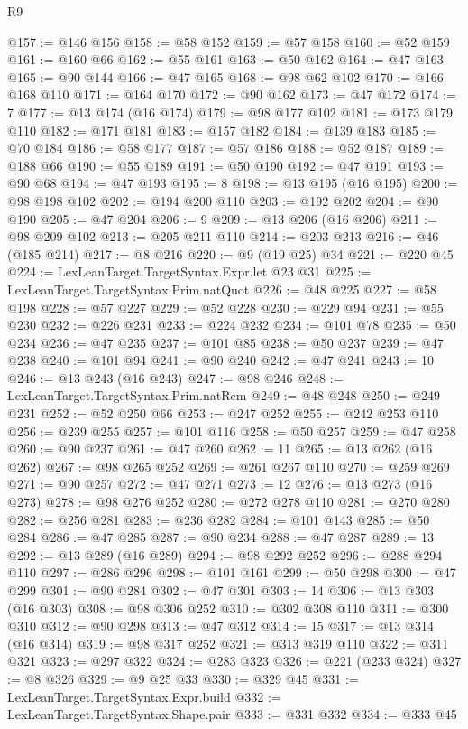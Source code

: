 \begin{lexlean}{R9}
\begin{coremodule}
@157 := @146 @156
@158 := @58 @152
@159 := @57 @158
@160 := @52 @159
@161 := @160 @66
@162 := @55 @161
@163 := @50 @162
@164 := @47 @163
@165 := @90 @144
@166 := @47 @165
@168 := @98 @62 @102
@170 := @166 @168 @110
@171 := @164 @170
@172 := @90 @162
@173 := @47 @172
@174 := 7
@177 := @13 @174 (@16 @174)
@179 := @98 @177 @102
@181 := @173 @179 @110
@182 := @171 @181
@183 := @157 @182
@184 := @139 @183
@185 := @70 @184
@186 := @58 @177
@187 := @57 @186
@188 := @52 @187
@189 := @188 @66
@190 := @55 @189
@191 := @50 @190
@192 := @47 @191
@193 := @90 @68
@194 := @47 @193
@195 := 8
@198 := @13 @195 (@16 @195)
@200 := @98 @198 @102
@202 := @194 @200 @110
@203 := @192 @202
@204 := @90 @190
@205 := @47 @204
@206 := 9
@209 := @13 @206 (@16 @206)
@211 := @98 @209 @102
@213 := @205 @211 @110
@214 := @203 @213
@216 := @46 (@185 @214)
@217 := @8 @216
@220 := @9 (@19 @25) @34
@221 := @220 @45
@224 := LexLeanTarget.TargetSyntax.Expr.let @23 @31
@225 := LexLeanTarget.TargetSyntax.Prim.natQuot
@226 := @48 @225
@227 := @58 @198
@228 := @57 @227
@229 := @52 @228
@230 := @229 @94
@231 := @55 @230
@232 := @226 @231
@233 := @224 @232
@234 := @101 @78
@235 := @50 @234
@236 := @47 @235
@237 := @101 @85
@238 := @50 @237
@239 := @47 @238
@240 := @101 @94
@241 := @90 @240
@242 := @47 @241
@243 := 10
@246 := @13 @243 (@16 @243)
@247 := @98 @246
@248 := LexLeanTarget.TargetSyntax.Prim.natRem
@249 := @48 @248
@250 := @249 @231
@252 := @52 @250 @66
@253 := @247 @252
@255 := @242 @253 @110
@256 := @239 @255
@257 := @101 @116
@258 := @50 @257
@259 := @47 @258
@260 := @90 @237
@261 := @47 @260
@262 := 11
@265 := @13 @262 (@16 @262)
@267 := @98 @265 @252
@269 := @261 @267 @110
@270 := @259 @269
@271 := @90 @257
@272 := @47 @271
@273 := 12
@276 := @13 @273 (@16 @273)
@278 := @98 @276 @252
@280 := @272 @278 @110
@281 := @270 @280
@282 := @256 @281
@283 := @236 @282
@284 := @101 @143
@285 := @50 @284
@286 := @47 @285
@287 := @90 @234
@288 := @47 @287
@289 := 13
@292 := @13 @289 (@16 @289)
@294 := @98 @292 @252
@296 := @288 @294 @110
@297 := @286 @296
@298 := @101 @161
@299 := @50 @298
@300 := @47 @299
@301 := @90 @284
@302 := @47 @301
@303 := 14
@306 := @13 @303 (@16 @303)
@308 := @98 @306 @252
@310 := @302 @308 @110
@311 := @300 @310
@312 := @90 @298
@313 := @47 @312
@314 := 15
@317 := @13 @314 (@16 @314)
@319 := @98 @317 @252
@321 := @313 @319 @110
@322 := @311 @321
@323 := @297 @322
@324 := @283 @323
@326 := @221 (@233 @324)
@327 := @8 @326
@329 := @9 @25 @33
@330 := @329 @45
@331 := LexLeanTarget.TargetSyntax.Expr.build
@332 := LexLeanTarget.TargetSyntax.Shape.pair
@333 := @331 @332
@334 := @333 @45

\end{coremodule}
\end{lexlean}
